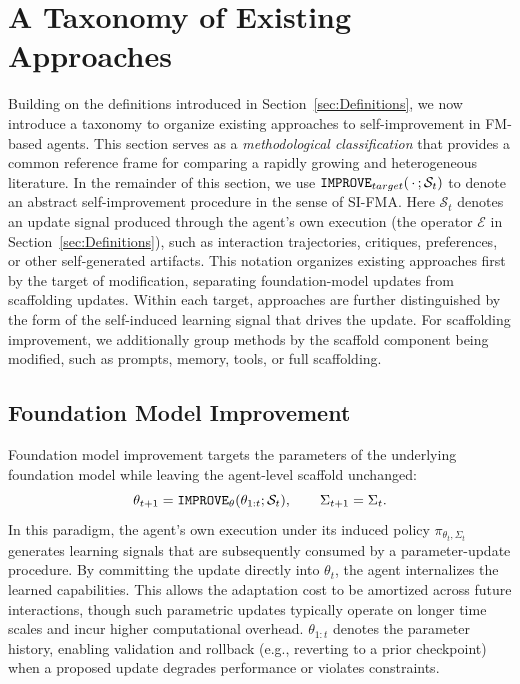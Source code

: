 \section{A Taxonomy of Existing Approaches}
\label{sec:A_Taxonomy_of_Self_Improvement_Mechanisms}

Building on the definitions introduced in
Section~\ref{sec:Definitions}, we now introduce a taxonomy to organize existing approaches to self-improvement in FM-based agents. This section serves as a \emph{methodological classification} that provides a common reference frame for comparing a rapidly growing and heterogeneous literature. In the remainder of this section, we use $\operatorname{\mathtt{IMPROVE}}_{target}(\,\cdot\,;\mathcal{S}_t)$ to denote an abstract self-improvement procedure in the sense of SI-FMA. Here $\mathcal{S}_t$ denotes an update signal produced through the agent’s own execution (the operator $\mathcal{E}$ in Section~\ref{sec:Definitions}), such as interaction trajectories, critiques, preferences, or other self-generated artifacts. This notation organizes existing approaches first by the target of modification, separating foundation-model updates from scaffolding updates. Within each target, approaches are further distinguished by the form of the self-induced learning signal that drives the update. For scaffolding improvement, we additionally group methods by the scaffold component being modified, such as prompts, memory, tools, or full scaffolding.

\subsection{Foundation Model Improvement}
\label{subsec:Foundation_Model_Improvement_(The_Parametric_Slow_Loop)}

Foundation model improvement targets the parameters of the underlying foundation model while leaving the agent-level scaffold unchanged:
\begin{equation}
    \theta_{t+1} = \operatorname{\mathtt{IMPROVE}}_{\theta}(\theta_{1:t}; \mathcal{S}_{t}),
    \qquad
    \Sigma_{t+1} = \Sigma_{t}.
\end{equation}
In this paradigm, the agent’s own execution under its induced policy $\pi_{\theta_t,\Sigma_t}$ generates learning signals that are subsequently consumed by a parameter-update procedure. By committing the update directly into $\theta_t$, the agent internalizes the learned capabilities. This allows the adaptation cost to be amortized across future interactions, though such parametric updates typically operate on longer time scales and incur higher computational overhead. $\theta_{1:t}$ denotes the parameter history, enabling validation and rollback (e.g., reverting to a prior checkpoint) when a proposed update degrades performance or violates constraints.



